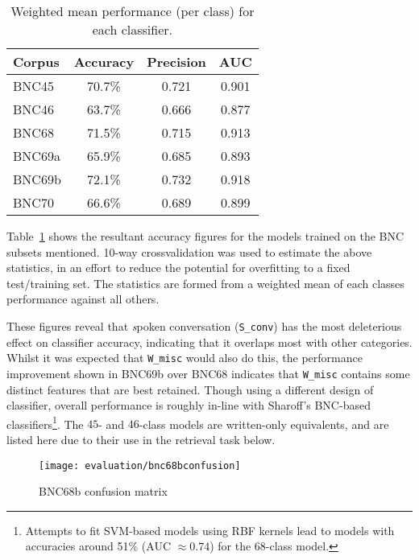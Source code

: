 \begin{table}[ht]
    \centering

    \begin{tabular}{|l|c|c|c|}
        \hline 
        Corpus & Accuracy & Precision & AUC \\
        \hline
        BNC45  &  70.7\%  &  0.721  &  0.901 \\
        BNC46  &  63.7\%  &  0.666  &  0.877 \\
        BNC68  &  71.5\%  &  0.715  &  0.913 \\
        BNC69a &  65.9\%  &  0.685  &  0.893 \\
        BNC69b &  72.1\%  &  0.732  &  0.918 \\
        BNC70  &  66.6\%  &  0.689  &  0.899 \\
        \hline
    \end{tabular}
    \caption{Weighted mean performance (per class) for each classifier.}
    \label{table:evaluation:heuristics:classifieraccuracy}
\end{table}

Table~\ref{table:evaluation:heuristics:classifieraccuracy} shows the resultant accuracy figures for the models trained on the BNC subsets mentioned.  10-way crossvalidation was used to estimate the above statistics, in an effort to reduce the potential for overfitting to a fixed test/training set.  The statistics are formed from a weighted mean of each classes performance against all others.

These figures reveal that {\textsl spoken conversation} (\texttt{S\_conv}) has the most deleterious effect on classifier accuracy, indicating that it overlaps most with other categories.  Whilst it was expected that \texttt{W\_misc} would also do this, the performance improvement shown in BNC69b over BNC68 indicates that \texttt{W\_misc} contains some distinct features that are best retained.  Though using a different design of classifier, overall performance is roughly in-line with Sharoff's BNC-based classifiers\footnote{Attempts to fit SVM-based models using RBF kernels lead to models with accuracies around 51\% (AUC $\approx 0.74$) for the 68-class model.}\cite{sharoff2007classifying}.  The $45$- and $46$-class models are written-only equivalents, and are listed here due to their use in the retrieval task below.

    

\begin{figure}[ht]
    \centering
    \texttt{[image: evaluation/bnc68bconfusion]}
    \caption{BNC68b confusion matrix}
    \label{fig:evaluation:heuristics:bnc68bconfusion}
\end{figure}



